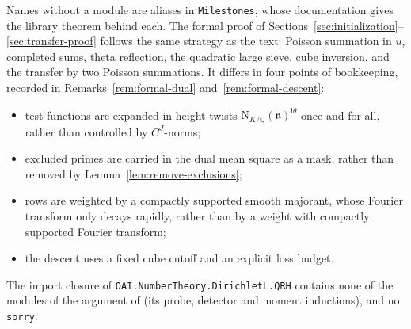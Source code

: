 \documentclass[11pt,a4paper]{article}
\numberwithin{equation}{section}
\numberwithin{figure}{section}
\theoremstyle{definition}
\theoremstyle{remark}
\newcommand{\Q}{\mathbb Q}
\newcommand{\NK}{\mathrm N_{K/\Q}}
\begin{document}
\medskip
Names without a module are aliases in \texttt{Milestones}, whose documentation gives the
library theorem behind each. The formal proof of
Sections~\ref{sec:initialization}--\ref{sec:transfer-proof} follows the same strategy as the
text: Poisson summation in $u$, completed sums, theta reflection, the quadratic large sieve, cube
inversion, and the transfer by two Poisson summations. It differs in four points of
bookkeeping, recorded in Remarks~\ref{rem:formal-dual} and~\ref{rem:formal-descent}:
\begin{itemize}
\item test functions are expanded in height twists $\NK(\mathfrak n)^{\mathrm i\theta}$ once and
for all, rather than controlled by $C^J$-norms;
\item excluded primes are carried in the dual mean square as a mask, rather than removed by
Lemma~\ref{lem:remove-exclusions};
\item rows are weighted by a compactly supported smooth majorant, whose Fourier transform only
decays rapidly, rather than by a weight with compactly supported Fourier transform;
\item the descent uses a fixed cube cutoff and an explicit loss budget.
\end{itemize}
The import closure of \texttt{OAI.NumberTheory.\allowbreak DirichletL.\allowbreak QRH} contains none of the modules of
the argument of \cite{OpenAI26} (its probe, detector and moment inductions), and no
\texttt{sorry}.
\end{document}
